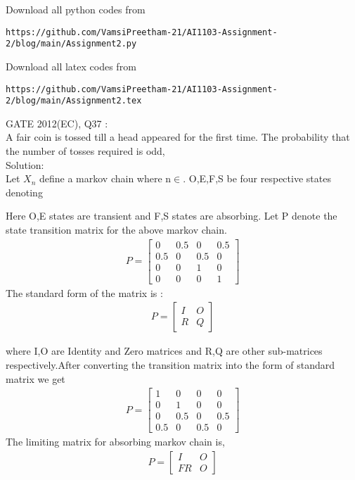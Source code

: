 \documentclass[journal,12pt,twocolumn]{IEEEtran}
\begin{document}
Download all python codes from
\begin{lstlisting}
https://github.com/VamsiPreetham-21/AI1103-Assignment-2/blog/main/Assignment2.py
\end{lstlisting}

Download all latex codes from
\begin{lstlisting}
https://github.com/VamsiPreetham-21/AI1103-Assignment-2/blog/main/Assignment2.tex
\end{lstlisting}

GATE 2012(EC), Q37 :\\
A fair coin is tossed till a head appeared for the first time. The probability that the number of tosses required is odd,\\

Solution:\\
Let $X_n$ define a markov chain where n$\in$. O,E,F,S be four respective states denoting 

Here O,E states are transient and F,S states are absorbing. 
Let P denote the state transition matrix for the above markov chain.
\begin{align}P =
\begin{bmatrix}
0 & 0.5 & 0 & 0.5 \\
0.5 & 0 & 0.5 & 0 \\
0 & 0 & 1 & 0 \\
0 & 0 & 0 & 1
\end{bmatrix}
\end{align}
The standard form of the matrix is :
\begin{align}P = 
\begin{bmatrix}
I & O \\
R & Q 
\end{bmatrix}
\end{align}

where I,O are Identity and Zero matrices and R,Q are other sub-matrices respectively.After converting the transition matrix into the form of standard matrix we get
\begin{align} P = 
\begin{bmatrix}
1 & 0 & 0 & 0 \\
0 & 1 & 0 & 0 \\
0 & 0.5 & 0 & 0.5 \\
0.5 & 0 & 0.5 & 0 
\end{bmatrix}
\end{align}
The limiting matrix for absorbing markov chain is,
\begin{align}P = 
\begin{bmatrix}
I & O \\
FR & O
\end{bmatrix}
\end{align}
\end{document}
